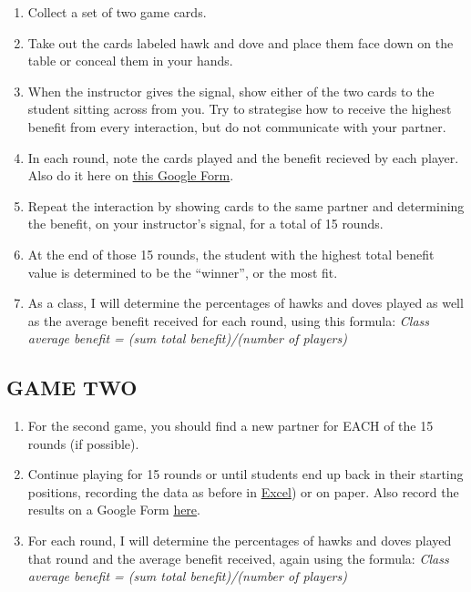 \documentclass[
  a4paper]{book}
\begin{document}
\begin{enumerate}
\def\labelenumi{\arabic{enumi}.}
\item
  Collect a set of two game cards.
\item
  Take out the cards labeled hawk and dove and place them face down on the table or conceal them in your hands.
\item
  When the instructor gives the signal, show either of the two cards to the student sitting across from you. Try to strategise how to receive the highest benefit from every interaction, but do not communicate with your partner.
\item
  In each round, note the cards played and the benefit recieved by each player. Also do it here on \href{https://forms.gle/3fjBGF7xVAYRQ5hXA}{this Google Form}.
\item
  Repeat the interaction by showing cards to the same partner and determining the benefit, on your instructor's signal, for a total of 15 rounds.
\item
  At the end of those 15 rounds, the student with the highest total benefit value is determined to be the ``winner'', or the most fit.
\item
  As a class, I will determine the percentages of hawks and doves played as well as the average benefit received for each round, using this formula: \emph{Class average benefit = (sum total benefit)/(number of players)}
\end{enumerate}

\hypertarget{game-two}{%
\subsection{GAME TWO}\label{game-two}}

\begin{enumerate}
\def\labelenumi{\arabic{enumi}.}
\item
  For the second game, you should find a new partner for EACH of the 15 rounds (if possible).
\item
  Continue playing for 15 rounds or until students end up back in their starting positions, recording the data as before in \href{https://www.dropbox.com/s/3tjkck3kmpek6xc/Table_3_Group_behavior.xlsx?dl=1}{Excel}) or on paper. Also record the results on a Google Form \href{https://forms.gle/F9YhYcTWRvoF4djt7}{here}.
\item
  For each round, I will determine the percentages of hawks and doves played that round and the average benefit received, again using the formula: \emph{Class average benefit = (sum total benefit)/(number of players)}
\end{enumerate}
\end{document}
